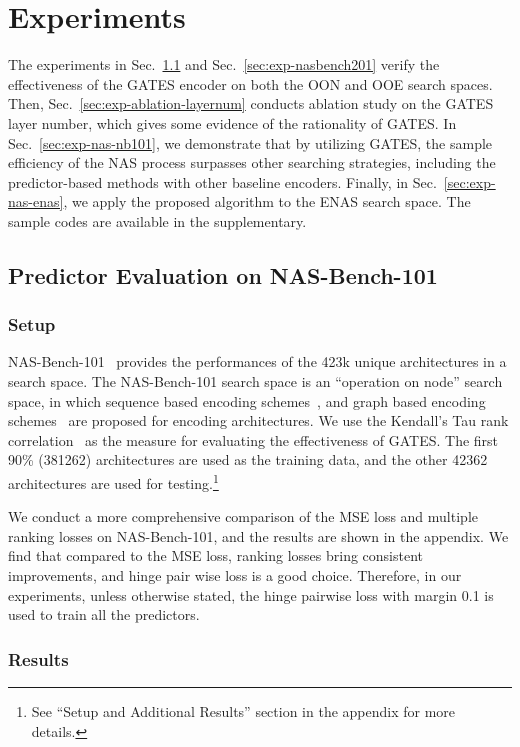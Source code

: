 \documentclass[runningheads]{llncs}
\begin{document}
\section{Experiments}
\label{sec:exp}
The experiments in Sec.~\ref{sec:exp-nasbench} and Sec.~\ref{sec:exp-nasbench201} verify the effectiveness of the GATES encoder on both the OON and OOE search spaces. 
Then, Sec.~\ref{sec:exp-ablation-layernum} conducts ablation study on the GATES layer number, which gives some evidence of the rationality of GATES.
In Sec.~\ref{sec:exp-nas-nb101}, we demonstrate that by utilizing GATES, the sample efficiency of the NAS process surpasses other searching strategies, including the predictor-based methods with other baseline encoders.
Finally, in Sec.~\ref{sec:exp-nas-enas}, we apply the proposed algorithm to the ENAS search space. The sample codes are available in the supplementary. 

\subsection{Predictor Evaluation on NAS-Bench-101}
\label{sec:exp-nasbench}

\subsubsection{Setup}
NAS-Bench-101~\cite{ying2019bench} provides the performances of the 423k unique architectures in a search space. The NAS-Bench-101 search space is an ``operation on node'' search space, in which sequence based encoding schemes~\cite{wang2018alphax}, and graph based encoding schemes~\cite{shi2019multi} are proposed for encoding architectures. We use the Kendall's Tau rank correlation~\cite{sen1968estimates} as the measure for evaluating the effectiveness of GATES. The first 90\% (381262) architectures are used as the training data, and the other 42362 architectures are used for testing.\footnote{See ``Setup and Additional Results'' section in the appendix for more details.}

We conduct a more comprehensive comparison of the MSE loss and multiple ranking losses on NAS-Bench-101, and the results are shown in the appendix. We find that compared to the MSE loss, ranking losses bring consistent improvements, and hinge pair wise loss is a good choice. Therefore, in our experiments, unless otherwise stated, the hinge pairwise loss with margin 0.1 is used to train all the predictors.


\subsubsection{Results}
\label{sec:exp-nasnbech-gates}
\end{document}
